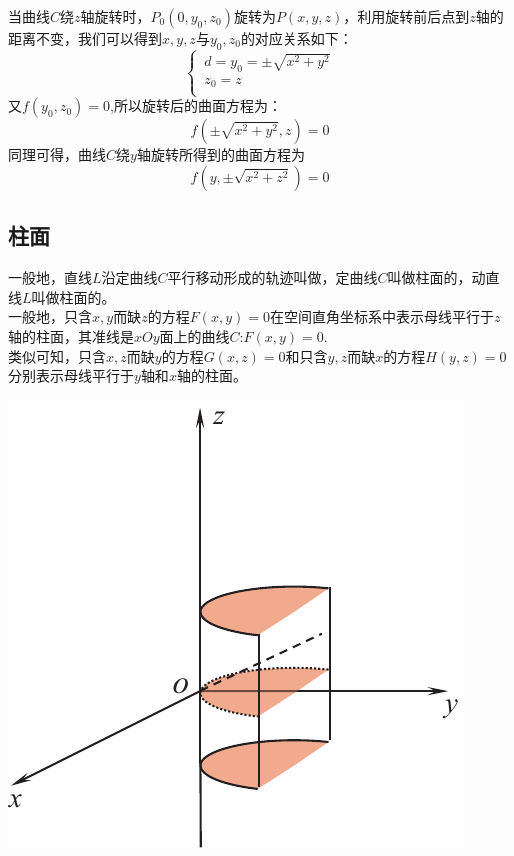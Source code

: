 \vspace*{0.5em}
\noindent 当曲线$C$绕$z$轴旋转时，$P_0(0,y_0,z_0)$旋转为$P(x,y,z)$，利用旋转前后点到$z$轴的距离不变，我们可以得到$x,y,z$与$y_0,z_0$的对应关系如下：
\begin{equation}
	\begin{cases}
	\,  d=y_0=\pm\sqrt{x^2+y^2}\\
	\, z_0=z\\
	\end{cases}
\end{equation}
又$f(y_0,z_0)=0$,所以旋转后的曲面方程为：
\begin{equation}
	f(\pm\sqrt{x^2+y^2},z)=0
\end{equation}
同理可得，曲线$C$绕$y$轴旋转所得到的曲面方程为
\begin{equation}
	f(y,\pm \sqrt{x^2+z^2})=0
\end{equation}
\subsection{柱面}


\noindent
\begin{minipage}{0.65\linewidth}
\hspace*{2em}一般地，直线$L$沿定曲线$C$平行移动形成的轨迹叫做，定曲线$C$叫做柱面的，动直线$L$叫做柱面的。\\
\hspace*{2em} 一般地，只含$x,y$而缺$z$的方程$F(x,y)=0$在空间直角坐标系中表示母线平行于$z$轴的柱面，其准线是$xOy$面上的曲线$C$:$F(x,y)=0$.\\
\hspace*{2em} 类似可知，只含$x,z$而缺$y$的方程$G(x,z)=0$和只含$y,z$而缺$x$的方程$H(y,z)=0$分别表示母线平行于$y$轴和$x$轴的柱面。
\end{minipage}
\begin{minipage}{0.35\linewidth}
	\centering
	\includegraphics[width = 0.85\linewidth]{pic/C-5/zhuti}
	\vspace*{-1em}
	\label{柱面}
\end{minipage}